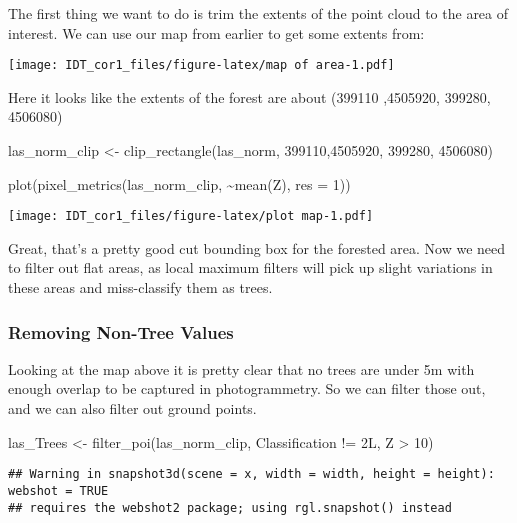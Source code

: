 \documentclass[
]{article}
\newenvironment{Shaded}{\begin{snugshade}}{\end{snugshade}}
\newcommand{\AttributeTok}[1]{\textcolor[rgb]{0.77,0.63,0.00}{#1}}
\newcommand{\DecValTok}[1]{\textcolor[rgb]{0.00,0.00,0.81}{#1}}
\newcommand{\FunctionTok}[1]{\textcolor[rgb]{0.00,0.00,0.00}{#1}}
\newcommand{\NormalTok}[1]{#1}
\newcommand{\OtherTok}[1]{\textcolor[rgb]{0.56,0.35,0.01}{#1}}
\newcommand{\SpecialCharTok}[1]{\textcolor[rgb]{0.00,0.00,0.00}{#1}}
\begin{document}
The first thing we want to do is trim the extents of the point cloud to
the area of interest. We can use our map from earlier to get some
extents from:

\texttt{[image: IDT\_cor1\_files/figure-latex/map of area-1.pdf]}

Here it looks like the extents of the forest are about (399110 ,4505920,
399280, 4506080)

\begin{Shaded}
\begin{Highlighting}[]
\NormalTok{las\_norm\_clip }\OtherTok{\textless{}{-}} \FunctionTok{clip\_rectangle}\NormalTok{(las\_norm, }\DecValTok{399110}\NormalTok{,}\DecValTok{4505920}\NormalTok{, }\DecValTok{399280}\NormalTok{, }\DecValTok{4506080}\NormalTok{)}

\FunctionTok{plot}\NormalTok{(}\FunctionTok{pixel\_metrics}\NormalTok{(las\_norm\_clip, }\SpecialCharTok{\textasciitilde{}}\FunctionTok{mean}\NormalTok{(Z), }\AttributeTok{res =} \DecValTok{1}\NormalTok{))}
\end{Highlighting}
\end{Shaded}

\texttt{[image: IDT\_cor1\_files/figure-latex/plot map-1.pdf]}

Great, that's a pretty good cut bounding box for the forested area. Now
we need to filter out flat areas, as local maximum filters will pick up
slight variations in these areas and miss-classify them as trees.

\hypertarget{removing-non-tree-values}{%
\subsubsection{Removing Non-Tree
Values}\label{removing-non-tree-values}}

Looking at the map above it is pretty clear that no trees are under 5m
with enough overlap to be captured in photogrammetry. So we can filter
those out, and we can also filter out ground points.

\begin{Shaded}
\begin{Highlighting}[]
\NormalTok{las\_Trees }\OtherTok{\textless{}{-}} \FunctionTok{filter\_poi}\NormalTok{(las\_norm\_clip, Classification }\SpecialCharTok{!=}\NormalTok{ 2L, Z }\SpecialCharTok{\textgreater{}} \DecValTok{10}\NormalTok{)}
\end{Highlighting}
\end{Shaded}

\begin{verbatim}
## Warning in snapshot3d(scene = x, width = width, height = height): webshot = TRUE
## requires the webshot2 package; using rgl.snapshot() instead
\end{verbatim}
\end{document}
